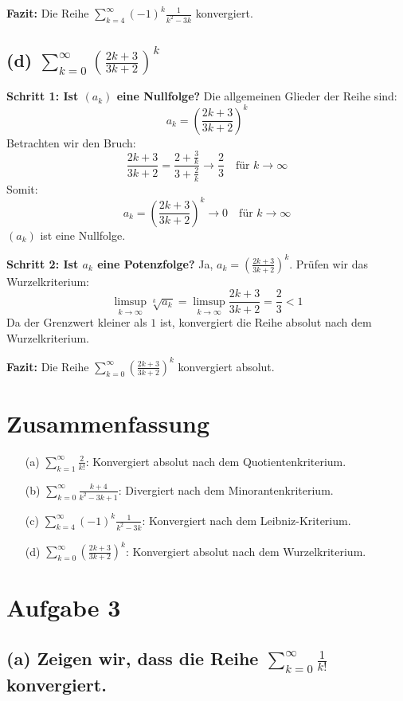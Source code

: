 \documentclass[11pt]{article}
\begin{document}
\textbf{Fazit:} Die Reihe \(\sum_{k=4}^\infty (-1)^k \frac{1}{k^2 - 3k}\) konvergiert.

\subsection*{(d) \(\sum_{k=0}^\infty \left(\frac{2k+3}{3k+2}\right)^k\)}

\textbf{Schritt 1: Ist \((a_k)\) eine Nullfolge?}
Die allgemeinen Glieder der Reihe sind:
\[
a_k = \left(\frac{2k+3}{3k+2}\right)^k
\]
Betrachten wir den Bruch:
\[
\frac{2k+3}{3k+2} = \frac{2 + \frac{3}{k}}{3 + \frac{2}{k}} \to \frac{2}{3} \quad \text{für } k \to \infty
\]
Somit:
\[
a_k = \left(\frac{2k+3}{3k+2}\right)^k \to 0 \quad \text{für } k \to \infty
\]
\((a_k)\) ist eine Nullfolge.

\textbf{Schritt 2: Ist \(a_k\) eine Potenzfolge?}
Ja, \(a_k = \left(\frac{2k+3}{3k+2}\right)^k\). Prüfen wir das Wurzelkriterium:
\[
\limsup_{k \to \infty} \sqrt[k]{a_k} = \limsup_{k \to \infty} \frac{2k+3}{3k+2} = \frac{2}{3} < 1
\]
Da der Grenzwert kleiner als \(1\) ist, konvergiert die Reihe absolut nach dem Wurzelkriterium.

\textbf{Fazit:} Die Reihe \(\sum_{k=0}^\infty \left(\frac{2k+3}{3k+2}\right)^k\) konvergiert absolut.

\section*{Zusammenfassung}
\begin{enumerate}
    \item[(a)] \(\sum_{k=1}^\infty \frac{2}{k!}\): Konvergiert absolut nach dem Quotientenkriterium.
    \item[(b)] \(\sum_{k=0}^\infty \frac{k+4}{k^2 - 3k + 1}\): Divergiert nach dem Minorantenkriterium.
    \item[(c)] \(\sum_{k=4}^\infty (-1)^k \frac{1}{k^2 - 3k}\): Konvergiert nach dem Leibniz-Kriterium.
    \item[(d)] \(\sum_{k=0}^\infty \left(\frac{2k+3}{3k+2}\right)^k\): Konvergiert absolut nach dem Wurzelkriterium.
\end{enumerate}


\section*{Aufgabe 3}

\subsection*{(a) Zeigen wir, dass die Reihe \(\sum_{k=0}^\infty \frac{1}{k!}\) konvergiert.}
\end{document}
